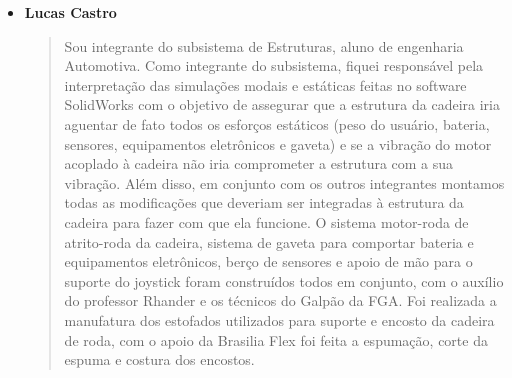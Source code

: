 \begin{itemize}
    \item \textbf{Lucas Castro}
    \begin{quote}
        Sou integrante do subsistema de Estruturas, aluno de engenharia Automotiva. Como integrante do subsistema, fiquei responsável pela interpretação das simulações modais e estáticas feitas no software SolidWorks com o objetivo de assegurar que a estrutura da cadeira iria aguentar de fato todos os esforços estáticos (peso do usuário, bateria, sensores, equipamentos eletrônicos e gaveta) e se a vibração do motor acoplado à cadeira não iria comprometer a estrutura com a sua vibração. Além disso, em conjunto com os outros integrantes montamos todas as modificações que deveriam ser integradas à estrutura da cadeira para fazer com que ela funcione. O sistema motor-roda de atrito-roda da cadeira, sistema de gaveta para comportar bateria e equipamentos eletrônicos, berço de sensores e apoio de mão para o suporte do joystick foram construídos todos em conjunto, com o auxílio do professor Rhander e os técnicos do Galpão da FGA. Foi realizada a manufatura dos estofados utilizados para suporte e encosto da cadeira de roda, com o apoio da Brasilia Flex foi feita a espumação, corte da espuma e costura dos encostos. 
    \end{quote}
\end{itemize}
